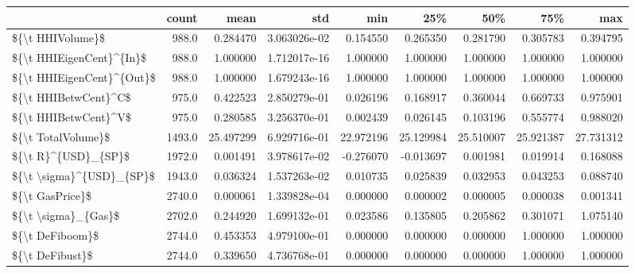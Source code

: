 \begin{tabular}{lrrrrrrrr}
\toprule
{} &   count &       mean &           std &        min &        25\% &        50\% &        75\% &        max \\
\midrule
\$\{\textbackslash t HHIVolume\}\$          &   988.0 &   0.284470 &  3.063026e-02 &   0.154550 &   0.265350 &   0.281790 &   0.305783 &   0.394795 \\
\$\{\textbackslash t HHIEigenCent\}\textasciicircum \{In\}\$  &   988.0 &   1.000000 &  1.712017e-16 &   1.000000 &   1.000000 &   1.000000 &   1.000000 &   1.000000 \\
\$\{\textbackslash t HHIEigenCent\}\textasciicircum \{Out\}\$ &   988.0 &   1.000000 &  1.679243e-16 &   1.000000 &   1.000000 &   1.000000 &   1.000000 &   1.000000 \\
\$\{\textbackslash t HHIBetwCent\}\textasciicircum C\$      &   975.0 &   0.422523 &  2.850279e-01 &   0.026196 &   0.168917 &   0.360044 &   0.669733 &   0.975901 \\
\$\{\textbackslash t HHIBetwCent\}\textasciicircum V\$      &   975.0 &   0.280585 &  3.256370e-01 &   0.002439 &   0.026145 &   0.103196 &   0.555774 &   0.988020 \\
\$\{\textbackslash t TotalVolume\}\$        &  1493.0 &  25.497299 &  6.929716e-01 &  22.972196 &  25.129984 &  25.510007 &  25.921387 &  27.731312 \\
\$\{\textbackslash t R\}\textasciicircum \{USD\}\_\{SP\}\$       &  1972.0 &   0.001491 &  3.978617e-02 &  -0.276070 &  -0.013697 &   0.001981 &   0.019914 &   0.168088 \\
\$\{\textbackslash t \textbackslash sigma\}\textasciicircum \{USD\}\_\{SP\}\$  &  1943.0 &   0.036324 &  1.537263e-02 &   0.010735 &   0.025839 &   0.032953 &   0.043253 &   0.088740 \\
\$\{\textbackslash t GasPrice\}\$           &  2740.0 &   0.000061 &  1.339828e-04 &   0.000000 &   0.000002 &   0.000005 &   0.000038 &   0.001341 \\
\$\{\textbackslash t \textbackslash sigma\}\_\{Gas\}\$       &  2702.0 &   0.244920 &  1.699132e-01 &   0.023586 &   0.135805 &   0.205862 &   0.301071 &   1.075140 \\
\$\{\textbackslash t DeFiboom\}\$           &  2744.0 &   0.453353 &  4.979100e-01 &   0.000000 &   0.000000 &   0.000000 &   1.000000 &   1.000000 \\
\$\{\textbackslash t DeFibust\}\$           &  2744.0 &   0.339650 &  4.736768e-01 &   0.000000 &   0.000000 &   0.000000 &   1.000000 &   1.000000 \\
\bottomrule
\end{tabular}
